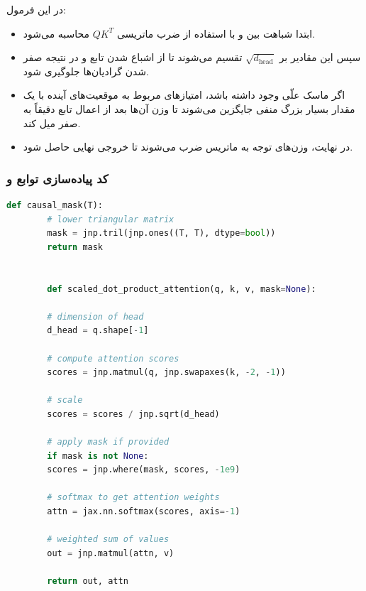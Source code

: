 \documentclass{article}
\begin{document}
در این فرمول:
\begin{itemize}
	\item ابتدا شباهت بین  و  با استفاده از ضرب ماتریسی $QK^T$ محاسبه می‌شود.
	\item سپس این مقادیر بر $\sqrt{d_{\mathrm{head}}}$ تقسیم می‌شوند تا از اشباع شدن تابع  و در نتیجه صفر شدن گرادیان‌ها جلوگیری شود.
	\item اگر ماسک علّی وجود داشته باشد، امتیازهای مربوط به موقعیت‌های آینده با یک مقدار بسیار بزرگ منفی جایگزین می‌شوند تا وزن آن‌ها بعد از اعمال تابع  دقیقاً به صفر میل کند.
	\item در نهایت، وزن‌های توجه به ماتریس  ضرب می‌شوند تا خروجی نهایی حاصل شود.
\end{itemize}

\subsubsection*{کد پیاده‌سازی توابع  و }


\begin{latin}
	\begin{lstlisting}[language=Python, basicstyle=\ttfamily\scriptsize]
		def causal_mask(T):
		# lower triangular matrix
		mask = jnp.tril(jnp.ones((T, T), dtype=bool))
		return mask
		
		
		def scaled_dot_product_attention(q, k, v, mask=None):
		
		# dimension of head
		d_head = q.shape[-1]
		
		# compute attention scores
		scores = jnp.matmul(q, jnp.swapaxes(k, -2, -1))
		
		# scale
		scores = scores / jnp.sqrt(d_head)
		
		# apply mask if provided
		if mask is not None:
		scores = jnp.where(mask, scores, -1e9)
		
		# softmax to get attention weights
		attn = jax.nn.softmax(scores, axis=-1)
		
		# weighted sum of values
		out = jnp.matmul(attn, v)
		
		return out, attn
	\end{lstlisting}
\end{latin}
\end{document}
